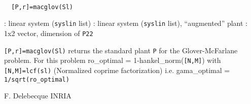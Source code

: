 \begin{mandesc}
   \\ %
\end{mandesc}
\begin{calling_sequence}
\begin{verbatim}
  [P,r]=macglov(Sl)  
\end{verbatim}
\end{calling_sequence}
\begin{parameters}
  \begin{varlist}
    : linear system (\verb!syslin! list)
    : linear system (\verb!syslin! list), ``augmented'' plant
    : 1x2 vector, dimension of \verb!P22!
  \end{varlist}
\end{parameters}
\begin{mandescription}
  \verb![P,r]=macglov(Sl)! returns the standard plant
  \verb!P! for the Glover-McFarlane problem.
  For this problem ro\_optimal = 1-hankel\_norm(\verb![N,M]!)
  with \verb![N,M]=lcf(sl)! (Normalized coprime factorization) i.e.
  gama\_optimal = \verb!1/sqrt(ro_optimal)!
\end{mandescription}
\begin{authors}
  F. Delebecque INRIA
\end{authors}
